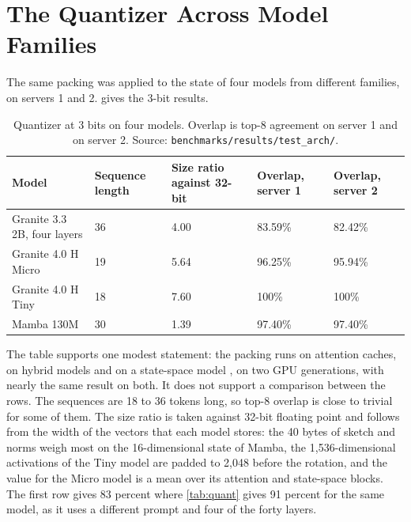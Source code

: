 
\FloatBarrier
\section{The Quantizer Across Model Families}
\label{sec:res-arch}

The same packing was applied to the state of four models from different
families, on servers 1 and 2.  gives the 3-bit results.

\begin{table}[htbp]
  \centering
  \caption[Quantizer at 3 bits on four models]{Quantizer at 3 bits on four models. Overlap is top-8 agreement on server 1 and on server 2. Source: \nolinkurl{benchmarks/results/test_arch/}.}
  \label{tab:arch}
  \small
  \begin{tabular}{L{4.6cm}L{2.1cm}L{2.0cm}L{2.2cm}L{2.2cm}}
    \toprule
    Model & Sequence length & Size ratio against 32-bit & Overlap, server 1 & Overlap, server 2 \\
    \midrule
    Granite 3.3 2B, four layers & 36 & 4.00 & 83.59\% & 82.42\% \\
    Granite 4.0 H Micro & 19 & 5.64 & 96.25\% & 95.94\% \\
    Granite 4.0 H Tiny & 18 & 7.60 & 100\% & 100\% \\
    Mamba 130M & 30 & 1.39 & 97.40\% & 97.40\% \\
    \bottomrule
  \end{tabular}
\end{table}

The table supports one modest statement: the packing runs on attention caches,
on hybrid models \citep{granite40micro,granite40tiny} and on a state-space
model \citep{mamba130m,gu2023mamba}, on two GPU generations, with nearly the
same result on both. It does not support a comparison between the rows. The
sequences are 18 to 36 tokens long, so top-8 overlap is close to trivial for
some of them. The size ratio is taken against 32-bit floating point and
follows from the width of the vectors that each model stores: the 40 bytes
of sketch and norms weigh most on the 16-dimensional state of Mamba, the
1,536-dimensional activations of the Tiny model are padded to 2,048 before
the rotation, and the value for the Micro model is a mean over its attention
and state-space blocks. The first row gives 83 percent where
\cref{tab:quant} gives 91 percent for the same model, as it uses a different
prompt and four of the forty layers.

